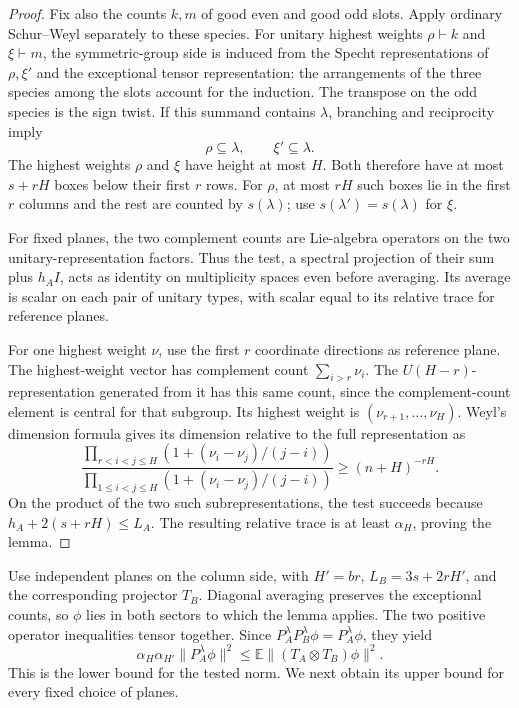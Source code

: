 \begin{proof}
Fix also the counts \(k,m\) of good even and good odd slots.
Apply ordinary Schur--Weyl separately to these species.  For unitary
highest weights \(\rho\vdash k\) and \(\xi\vdash m\), the symmetric-group
side is induced from the Specht representations of \(\rho,\xi'\) and
the exceptional tensor representation: the arrangements of the three
species among the slots account for the induction.  The transpose on the odd
species is the sign twist.  If this summand contains \(\lambda\),
branching and reciprocity imply
\[
 \rho\subseteq\lambda,\qquad \xi'\subseteq\lambda.
\]
The highest weights \(\rho\) and \(\xi\) have height at most \(H\).
Both therefore have at most \(s+rH\) boxes below their first \(r\) rows.  For \(\rho\), at most \(rH\) such boxes lie in
the first \(r\) columns and the rest are counted by \(s(\lambda)\);
use \(s(\lambda')=s(\lambda)\) for \(\xi\).

For fixed planes, the two complement counts are Lie-algebra operators
on the two unitary-representation factors.  Thus the test, a spectral
projection of their sum plus \(h_AI\), acts as identity on multiplicity
spaces even before averaging.  Its average is scalar on each pair of
unitary types, with scalar equal to its relative trace for reference
planes.

For one highest weight \(\nu\), use the first \(r\) coordinate directions
as reference plane.  The highest-weight vector has complement count
\(\sum_{i>r}\nu_i\).  The \(U(H-r)\)-representation generated from it
has this same count, since the complement-count element is central for
that subgroup.  Its highest weight is
\((\nu_{r+1},\ldots,\nu_H)\).  Weyl's dimension formula gives its
dimension relative to the full representation as
\[
 \frac{\prod_{r<i<j\le H}(1+(\nu_i-\nu_j)/(j-i))}
      {\prod_{1\le i<j\le H}(1+(\nu_i-\nu_j)/(j-i))}
 \ge(n+H)^{-rH}.
\]
On the product of the two such subrepresentations, the test succeeds
because \(h_A+2(s+rH)\le L_A\).  The resulting relative trace is at
least \(\alpha_H\), proving the lemma.
\end{proof}

Use independent planes on the column side, with \(H'=br\),
\(L_B=3s+2rH'\), and the corresponding projector \(T_B\).
Diagonal averaging preserves the exceptional counts, so \(\phi\) lies
in both sectors to which the lemma applies.  The two positive operator
inequalities tensor together.  Since
\(P_A^\lambda P_B^\lambda\phi=P_A^\lambda\phi\), they yield
\begin{equation}
 \alpha_H\alpha_{H'}\|P_A^\lambda\phi\|^2
 \le \mathbb E\|(T_A\otimes T_B)\phi\|^2.
 \label{ten:lowplanes:eq:20}
\end{equation}
This is the lower bound for the tested norm.  We next obtain its upper
bound for every fixed choice of planes.

